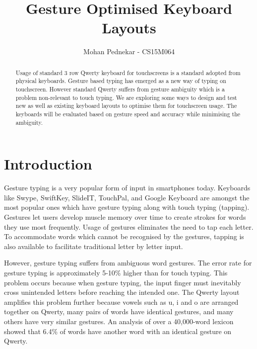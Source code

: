 \documentclass[12pt]{article}
\begin{document}
\title{Gesture Optimised Keyboard Layouts}
\author{Mohan Pednekar - CS15M064}
\date{}
\maketitle
\begin{abstract}
Usage of standard 3 row Qwerty keyboard for touchscreens is a standard adopted from physical keyboards. Gesture based typing has emerged as a new way of typing on touchscreen. However standard Qwerty suffers from gesture ambiguity which is a problem non-relevant to touch typing. We are exploring some ways to design and test new as well as existing keyboard layouts to optimise them for touchscreen usage. The keyboards will be evaluated based on gesture speed and accuracy while minimising the ambiguity.

\end{abstract}
\newpage


\tableofcontents


\newpage

\section{Introduction}


Gesture typing is a very popular form of input in smartphones today. Keyboards like Swype, SwiftKey, SlideIT, TouchPal, and Google Keyboard are amongst the most popular ones which have gesture typing along with touch typing (tapping). Gestures let users develop muscle memory over time to create strokes for words they use most frequently. Usage of gestures eliminates the need to tap each letter. To accommodate words which cannot be recognised by the gestures, tapping is also available to facilitate traditional letter by letter input.




However, gesture typing suffers from ambiguous word gestures. The error rate for gesture typing is approximately 5-10\% \cite{evaluation} higher than for touch typing.  This problem occurs because when gesture typing, the input finger must inevitably cross unintended letters before reaching the intended one. The Qwerty layout amplifies this problem further because vowels such as u, i and o are arranged together on Qwerty, many pairs of words have
identical gestures, and many others have very similar gestures. An analysis of over a 40,000-word lexicon showed that 6.4\% of words have another word with an identical gesture on Qwerty.
\end{document}
